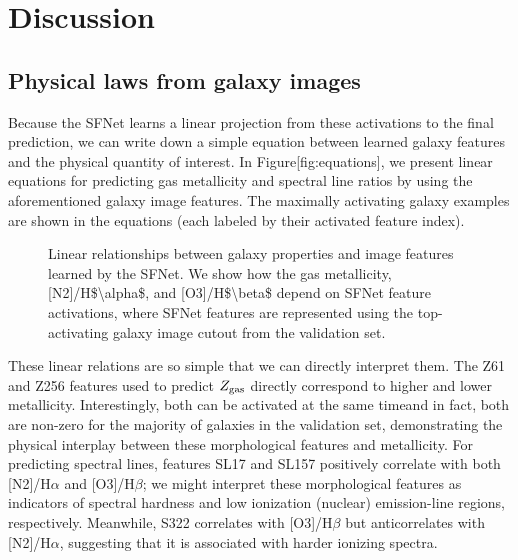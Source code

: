 \documentclass[11pt,a4paper]{article}
\begin{document}
\section{Discussion}

\subsection{Physical laws from galaxy images}

Because the SFNet learns a linear projection from these activations to the final prediction, we can write down a simple equation between learned galaxy features and the physical quantity of interest. In Figure[fig:equations], we present linear equations for predicting gas metallicity and spectral line ratios by using the aforementioned galaxy image features. The maximally activating galaxy examples are shown in the equations (each labeled by their activated feature index).

\begin{figure}[h]
\caption{Linear relationships between galaxy properties and image features learned by the SFNet. We show how the gas metallicity, [N2]/H\$\textbackslash{}alpha\$, and [O3]/H\$\textbackslash{}beta\$ depend on SFNet feature activations, where SFNet features are represented using the top-activating galaxy image cutout from the validation set.}
\end{figure}

These linear relations are so simple that we can directly interpret them. The Z61 and Z256 features used to predict $Z_{\rm gas}$ directly correspond to higher and lower metallicity. Interestingly, both can be activated at the same timeand in fact, both are non-zero for the majority of galaxies in the validation set, demonstrating the physical interplay between these morphological features and metallicity. For predicting spectral lines, features SL17 and SL157 positively correlate with both [N2]/H$\alpha$ and [O3]/H$\beta$; we might interpret these morphological features as indicators of spectral hardness and low ionization (nuclear) emission-line regions, respectively. Meanwhile, S322 correlates with [O3]/H$\beta$ but anticorrelates with [N2]/H$\alpha$, suggesting that it is associated with harder ionizing spectra.
\end{document}
